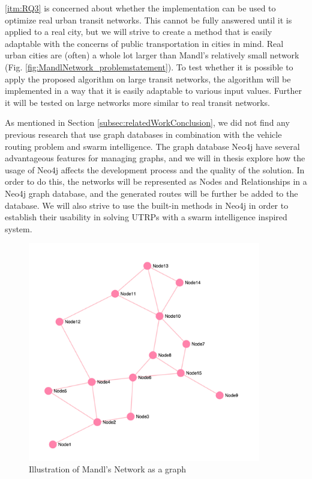 \vref{itm:RQ3} is concerned about whether the implementation can be used to optimize real urban transit networks. This cannot be fully answered until it is applied to a real city, but we will strive to create a method that is easily adaptable with the concerns of public transportation in cities in mind. Real urban cities are (often) a whole lot larger than Mandl's relatively small network (Fig. \vref{fig:MandlNetwork_problemstatement}). To  test whether it is possible to apply the proposed algorithm on large transit networks, the algorithm will be implemented in a way that it is easily adaptable to various input values. Further it will be tested on large networks more similar to real transit networks. 

As mentioned in Section \vref{subsec:relatedWorkConclusion}, we did not find any previous research that use graph databases in combination with the vehicle routing problem and swarm intelligence. The graph database Neo4j \citep{website:neo4j} have several advantageous features for managing graphs, and we will in thesis explore how the usage of Neo4j affects the development process and the quality of the solution.  In order to do this, the networks will be represented as Nodes and Relationships in a Neo4j graph database, and the generated routes will be further be added to the database. We will also strive to use the built-in methods in Neo4j in order to establish their usability in solving UTRPs with a swarm intelligence inspired system. 



\begin{figure}[H]
\begin{center}
  \includegraphics[width=4in]{assets/mandlnetwork_crop.png}
  \end{center}
  \caption{Illustration of Mandl's Network as a graph}
  \label{fig:MandlNetwork_problemstatement} 
\end{figure}








